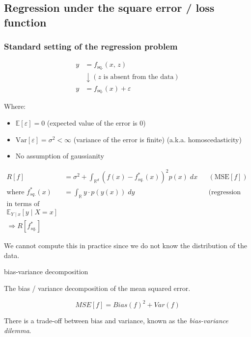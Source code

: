 \subsection{Regression under the square error / loss function}

\subsubsection{Standard setting of the regression problem}

\begin{align*}
	y & = f_\text{sq.}(x,\, z)                         \\
	  & \downarrow (z \text{ is absent from the data}) \\
	y & = f_\text{sq.}(x) + \varepsilon
\end{align*}

Where:
\begin{itemize}
	\item \(\mathds{E}[\varepsilon] = 0\) (expected value of the error is 0)
	\item \(\text{Var}[\varepsilon] = \sigma^2 < \infty\) (variance of the error is finite) (a.k.a. homoscedasticity)
	\item No assumption of gaussianity
\end{itemize}

\begin{prop}{}{}
	\begin{align*}
		R[f]                       & = \sigma^2 + \int_{\mathds{R}^d} (f(x) - f^*_{sq.}(x))^2 p(x)\; dx
		                           &                                                                    & (\text{MSE}[f])              \\
		\text{where } f^*_{sq.}(x) & = \int_{\mathds{R}} y\cdot p(y(x))\; dy
		                           &                                                                    & \text{(regression function)} \\
		\text{in terms of statistics: }                                                                                                \\ \mathds{E}_{Y \mid x}[y \mid X = x] \\
		\Rightarrow R[f^*_{sq.}]
	\end{align*}

	We cannot compute this in practice since we do not know the distribution
	of the data.
\end{prop}

\begin{prop}{bias-variance decomposition}{}

	The bias / variance decomposition of the mean squared error.

	\[MSE[f] = Bias(f)^2 + Var(f)
	\]

	There is a trade-off between bias and variance, known as the
	\emph{bias-variance dilemma}.
\end{prop}

